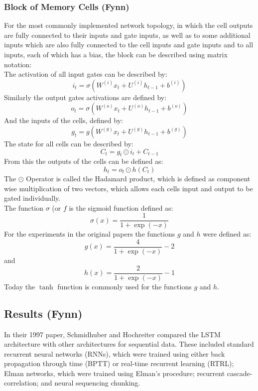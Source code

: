 \documentclass[twoside,a4paper,10pt,DIV=12,BCOR=12mm]{scrartcl}
\begin{document}
\subsubsection{Block of Memory Cells (Fynn)}
For the most commonly implemented network topology, in which the cell outputs are fully connected to their inputs and gate inputs, as well as to some additional inputs which are also fully connected to the cell inputs and gate inputs and to all inputs, each of which has a bias, the block can be described using matrix notation:\cite{smagulova2019notation}
\\
The activation of all input gates can be described by:\cite{smagulova2019notation}
$$i_t=\sigma\left(W^{(i)}x_t+U^{(i)}h_{t-1}+b^{(i)}\right)$$
Similarly the output gates activations are defined by:\cite{smagulova2019notation}
$$o_t=\sigma\left(W^{(o)}x_t+U^{(o)}h_{t-1}+b^{(o)}\right)$$
And the inputs of the cells, defined by:\cite{smagulova2019notation}
$$g_t=g\left(W^{(g)}x_t+U^{(g)}h_{t-1}+b^{(g)}\right)$$
The state for all cells can be described by:\cite{smagulova2019notation, hochreiter1991lstm}
$$C_t=g_t\odot i_t+C_{t-1}$$
From this the outputs of the cells can be defined as:\cite{smagulova2019notation, hochreiter1997lstm}
$$h_t=o_t\odot h(C_t)$$
The $\odot$ Operator is called the Hadamard product, which is defined as component wise multiplication of two vectors, which allows each cells input and output to be gated individually.\cite{gokmen2018hadamard, smagulova2019notation} \\ 

The function $\sigma$ (or $f$  is the sigmoid function defined as: \cite{hochreiter1997lstm} $$\sigma(x)=\frac{1}{1+\exp(-x)}$$
For the experiments in the original papers the functions $g$ and $h$ were defined as:\cite{hochreiter1997lstm}
$$g(x)=\frac{4}{1+\exp(-x)}-2$$
and \cite{hochreiter1997lstm}
$$h(x)=\frac{2}{1+\exp(-x)}-1$$
Today the $\tanh$ function is commonly used for the functions $g$ and $h$.\cite{smagulova2019notation}

\subsection{Results (Fynn)}

In their 1997 paper, Schmidhuber and Hochreiter compared the LSTM architecture with other architectures for sequential data. These included standard recurrent neural networks (RNNs), which were trained using either back propagation through time (BPTT) or real-time recurrent learning (RTRL); Elman networks, which were trained using Elman's procedure; recurrent cascade-correlation; and neural sequencing chunking.\cite{hochreiter1997lstm}  \\
\end{document}
